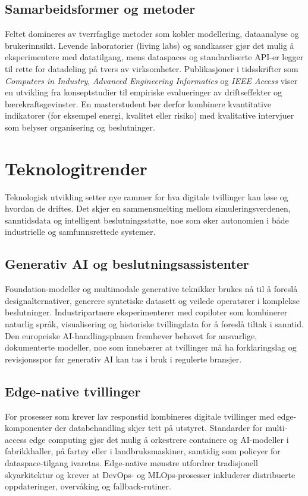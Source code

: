 \subsection{Samarbeidsformer og metoder}
Feltet domineres av tverrfaglige metoder som kobler modellering, dataanalyse og brukerinnsikt. Levende laboratorier (living labs) og sandkasser gjør det mulig å eksperimentere med datatilgang, mens dataspaces og standardiserte API-er legger til rette for datadeling på tvers av virksomheter. Publikasjoner i tidsskrifter som \emph{Computers in Industry}, \emph{Advanced Engineering Informatics} og \emph{IEEE Access} viser en utvikling fra konseptstudier til empiriske evalueringer av driftseffekter og bærekraftsgevinster. En masterstudent bør derfor kombinere kvantitative indikatorer (for eksempel energi, kvalitet eller risiko) med kvalitative intervjuer som belyser organisering og beslutninger.

\section{Teknologitrender}
Teknologisk utvikling setter nye rammer for hva digitale tvillinger kan løse og hvordan de driftes. Det skjer en sammensmelting mellom simuleringsverdenen, sanntidsdata og intelligent beslutningsstøtte, noe som øker autonomien i både industrielle og samfunnsrettede systemer.

\subsection{Generativ AI og beslutningsassistenter}
Foundation-modeller og multimodale generative teknikker brukes nå til å foreslå designalternativer, generere syntetiske datasett og veilede operatører i komplekse beslutninger. Industripartnere eksperimenterer med copiloter som kombinerer naturlig språk, visualisering og historiske tvillingdata for å foreslå tiltak i sanntid.\citep{siemens2023copilot} Den europeiske AI-handlingsplanen fremhever behovet for ansvarlige, dokumenterte modeller, noe som innebærer at tvillinger må ha forklaringslag og revisjonsspor før generativ AI kan tas i bruk i regulerte bransjer.\citep{eu2023ai}

\subsection{Edge-native tvillinger}
For prosesser som krever lav responstid kombineres digitale tvillinger med edge-komponenter der databehandling skjer tett på utstyret. Standarder for multi-access edge computing gjør det mulig å orkestrere containere og AI-modeller i fabrikkhaller, på fartøy eller i landbruksmaskiner, samtidig som policyer for dataspace-tilgang ivaretas.\citep{etsi2023mec} Edge-native mønstre utfordrer tradisjonell skyarkitektur og krever at DevOps- og MLOps-prosesser inkluderer distribuerte oppdateringer, overvåking og fallback-rutiner.

